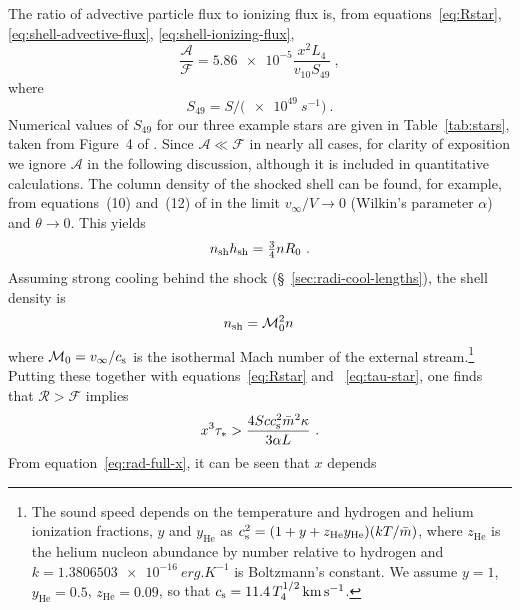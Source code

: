 The ratio of advective particle flux to ionizing flux is, from
equations~\eqref{eq:Rstar}, \eqref{eq:shell-advective-flux},
\eqref{eq:shell-ionizing-flux},
\begin{equation}
  \label{eq:advective-over-ionizing-flux}
  \frac{\mathcal{A}}{\mathcal{F}} = \num{5.86e-5} \frac{x^2 L_4}{v_{10} S_{49}} \ , 
\end{equation}
where
\begin{equation*}
  S_{49} = S / \bigl( \SI{e49}{s^{-1}} \bigr) \ .
\end{equation*}
Numerical values of \(S_{49}\) for our three example stars are given
in Table~\ref{tab:stars}, taken from Figure~4 of
\citet{Sternberg:2003a}.  Since \(\mathcal{A} \ll \mathcal{F}\) in
nearly all cases, for clarity of exposition we ignore \(\mathcal{A}\)
in the following discussion, although it is included in quantitative
calculations.  The column density of the shocked shell can be found,
for example, from equations~(10) and~(12) of \citet{Wilkin:1996a} in
the limit \(v_\infty/V \to 0\) (Wilkin's parameter \(\alpha\)) and
\(\theta \to 0\).  This yields
\begin{equation}
  \label{eq:shocked-shell-column}
  n\shell h\shell = \tfrac34 n R_0 \ .
\end{equation}
Assuming strong cooling behind the shock
(\S~\ref{sec:radi-cool-lengths}), the shell density is
\begin{equation}
  \label{eq:isothermal-shell-density}
  n\shell = \mathcal{M}_0^2 n \,
\end{equation}
where
\(\mathcal{M}_0 = v_\infty / \sound\) is the isothermal Mach number of the
external stream.\footnote{%
  \label{fn:temperature-dependence}
  The sound speed depends on the temperature and hydrogen and helium
  ionization fractions, \(y\) and \(y_{\text{He}}\) as
  \(\sound^2 = (1 + y + z_{\text{He}} y_{\text{He}}) (k T /
  \bar{m})\), where \(z_{\text{He}}\) is the helium nucleon abundance
  by number relative to hydrogen and
  \(k = \SI{1.3806503e-16}{erg.K^{-1}}\) is Boltzmann's constant.  We
  assume \(y = 1\), \(y_{\text{He}} = 0.5\), \(z_{\text{He}} = 0.09\),
  so that \(\sound = \num{11.4}\, T_4^{1/2}\, \si{km.s^{-1}}\). } %
Putting these together with equations~\eqref{eq:Rstar} and
~\eqref{eq:tau-star}, one finds that \(\mathcal{R} > \mathcal{F}\)
implies
\begin{equation}
  \label{eq:ifront-trap-x-cubed-taustar}
  x^3 \tau_* > \frac{4 S c \sound^2 \bar{m}^2 \kappa}{3 \alpha L} \ .
\end{equation}
From equation~\eqref{eq:rad-full-x}, it can be seen that \(x\) depends
